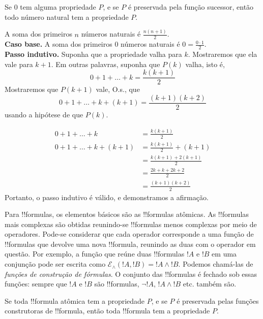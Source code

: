\documentclass[../../include/open-logic-section]{subfiles}
\begin{document}
\begin{defn}
Se 0 tem alguma propriedade $P$, e se $P$ é preservada pela função
sucessor, então todo número natural tem a propriedade $P$.
\end{defn}

\begin{ex} A soma dos primeiros $n$ números naturais é $\frac{n(n+1)}{2}$. \\

\textbf{Caso base.} A soma dos primeiros 0 números naturais é $0=
\frac{0\cdot 1}{2}$.\\

\textbf{Passo indutivo.} Suponha que a propriedade valha para $k$.
Mostraremos que ela vale para $k+1$. Em outras palavras, suponha que
$P(k)$ valha, isto é,
\[ 0 + 1 + \ldots + k = \frac{k(k+1)}{2} \]
Mostraremos que $P(k+1)$ vale, O.s.\@, que
\[ 0 + 1 + \ldots + k + (k+1) = \frac{(k+1)(k+2)}{2} \]
usando a hipótese de que $P(k)$.

\begin{align*}
0 + 1 + \ldots + k &= \frac{k(k+1)}{2} \tag{Hipótese} \\
0 + 1 + \ldots + k + (k+1) &= \frac{k(k+1)}{2} + (k+1)
\tag{Somar $k+1$ aos dois lados} \\
&= \frac{k(k+1) + 2(k+1)}{2} \\
&= \frac{2k + k + 2k +2}{2} \\
&=\frac{(k+1)(k+2)}{2}
\end{align*}
Portanto, o passo indutivo é válido, e demonstramos a afirmação.
\end{ex}

\begin{explain}
Para !!{formula}s, os elementos básicos são as !!{formula}s atômicas.
As !!{formula}s mais complexas são obtidas reunindo-se !!{formula}s menos
complexas por meio de operadores. Pode-se considerar que cada operador
corresponde a uma função de !!{formula}s que devolve uma nova !!{formula},
reunindo as duas com o operador em questão. Por exemplo, a função que reúne
duas !!{formula}s $!A$ e $!B$ em uma conjunção pode ser escrita como
$\mathcal E _\land (!A, !B) = !A \land !B$. Podemos chamá-las de
\emph{funções de construção de fórmulas}. O conjunto das !!{formula}s é
fechado sob essas funções: sempre que $!A$ e $!B$ são !!{formula}s,
$\lnot !A$, $!A \land !B$ etc. também são.
\end{explain}

\begin{defn}
Se toda !!{formula} atômica tem a propriedade $P$, e se $P$ é preservada
pelas funções construtoras de !!{formula}, então toda !!{formula} tem
a propriedade $P$.
\end{defn}
\end{document}
